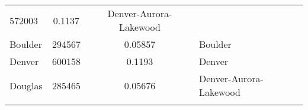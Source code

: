 \documentclass[12pt,twoside]{reedthesis}
\begin{document}
\begin{longtable}[]{@{}lccl@{}}
\begin{minipage}[t]{0.21\columnwidth}
  572003\strut
  \end{minipage} & \begin{minipage}[t]{0.20\columnwidth}\centering\strut
  0.1137\strut
  \end{minipage} & \begin{minipage}[t]{0.34\columnwidth}\raggedright\strut
  Denver-Aurora-Lakewood\strut
  \end{minipage}\tabularnewline
  \begin{minipage}[t]{0.13\columnwidth}\raggedright\strut
  Boulder\strut
  \end{minipage} & \begin{minipage}[t]{0.21\columnwidth}\centering\strut
  294567\strut
  \end{minipage} & \begin{minipage}[t]{0.20\columnwidth}\centering\strut
  0.05857\strut
  \end{minipage} & \begin{minipage}[t]{0.34\columnwidth}\raggedright\strut
  Boulder\strut
  \end{minipage}\tabularnewline
  \begin{minipage}[t]{0.13\columnwidth}\raggedright\strut
  Denver\strut
  \end{minipage} & \begin{minipage}[t]{0.21\columnwidth}\centering\strut
  600158\strut
  \end{minipage} & \begin{minipage}[t]{0.20\columnwidth}\centering\strut
  0.1193\strut
  \end{minipage} & \begin{minipage}[t]{0.34\columnwidth}\raggedright\strut
  Denver\strut
  \end{minipage}\tabularnewline
  \begin{minipage}[t]{0.13\columnwidth}\raggedright\strut
  Douglas\strut
  \end{minipage} & \begin{minipage}[t]{0.21\columnwidth}\centering\strut
  285465\strut
  \end{minipage} & \begin{minipage}[t]{0.20\columnwidth}\centering\strut
  0.05676\strut
  \end{minipage} & \begin{minipage}[t]{0.34\columnwidth}\raggedright\strut
  Denver-Aurora-Lakewood\strut
  \end{minipage}\tabularnewline
  \begin{minipage}[t]{0.13\columnwidth}\raggedright\strut

\end{minipage}
\end{longtable}
\end{document}
